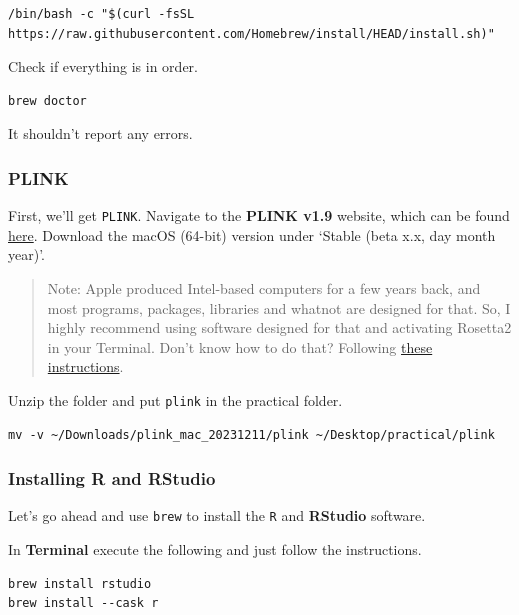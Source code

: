 \documentclass[
]{book}
\newcommand{\passthrough}[1]{#1}
\begin{document}
\begin{lstlisting}
/bin/bash -c "$(curl -fsSL https://raw.githubusercontent.com/Homebrew/install/HEAD/install.sh)"
\end{lstlisting}

Check if everything is in order.

\begin{lstlisting}
brew doctor
\end{lstlisting}

It shouldn't report any errors.

\hypertarget{plink-1}{%
\subsubsection{PLINK}\label{plink-1}}

First, we'll get \passthrough{\lstinline!PLINK!}. Navigate to the \textbf{PLINK v1.9} website, which can be found \href{https://www.cog-genomics.org/plink2}{here}. Download the macOS (64-bit) version under `Stable (beta x.x, day month year)'.

\begin{quote}
Note: Apple produced Intel-based computers for a few years back, and most programs, packages, libraries and whatnot are designed for that. So, I highly recommend using software designed for that and activating Rosetta2 in your Terminal. Don't know how to do that? Following \href{https://support.apple.com/en-us/102527}{these instructions}.
\end{quote}

Unzip the folder and put \passthrough{\lstinline!plink!} in the practical folder.

\begin{lstlisting}
mv -v ~/Downloads/plink_mac_20231211/plink ~/Desktop/practical/plink 
\end{lstlisting}

\hypertarget{installing-r-and-rstudio}{%
\subsubsection{Installing R and RStudio}\label{installing-r-and-rstudio}}

Let's go ahead and use \passthrough{\lstinline!brew!} to install the \passthrough{\lstinline!R!} and \textbf{RStudio} software.

In \textbf{Terminal} execute the following and just follow the instructions.

\begin{lstlisting}
brew install rstudio
brew install --cask r
\end{lstlisting}
\end{document}
